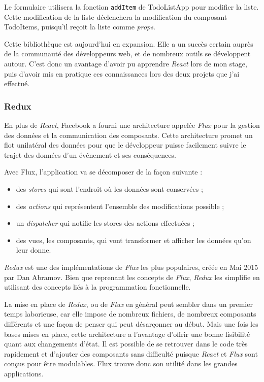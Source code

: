 Le formulaire utilisera la fonction \texttt{addItem} de TodoListApp pour
modifier la liste. Cette modification de la liste déclenchera la
modification du composant TodoItems, puisqu'il reçoit la liste comme
\emph{props}.

\bigskip

Cette bibliothèque est aujourd'hui en expansion. Elle a un succès
certain auprès de la communauté des développeurs web, et de nombreux
outils se développent autour. C'est donc un avantage d'avoir pu
apprendre \emph{React} lors de mon stage, puis d'avoir mis en pratique
ces connaissances lors des deux projets que j'ai effectué.

\bigskip

\subsubsection{Redux}\label{redux}

\bigskip

En plus de \emph{React}, Facebook a fourni une architecture appelée
\emph{Flux} pour la gestion des données et la communication des
composants. Cette architecture promet un flot unilatéral des données
pour que le développeur puisse facilement suivre le trajet des données
d'un événement et ses conséquences.

\bigskip

Avec Flux, l'application va se décomposer de la façon suivante :

\begin{itemize}
\tightlist
\item
  des \emph{stores} qui sont l'endroit où les données sont conservées ;
\item
  des \emph{actions} qui représentent l'ensemble des modifications
  possible ;
\item
  un \emph{dispatcher} qui notifie les stores des actions effectuées ;
\item
  des vues, les composants, qui vont transformer et afficher les données
  qu'on leur donne.
\end{itemize}

\bigskip

\emph{Redux} est une des implémentations de \emph{Flux} les plus
populaires, créée en Mai 2015 par Dan Abramov. Bien que reprenant les
concepts de \emph{Flux}, \emph{Redux} les simplifie en utilisant des
concepts liés à la programmation fonctionnelle.

\bigskip

La mise en place de \emph{Redux}, ou de \emph{Flux} en général peut
sembler dans un premier temps laborieuse, car elle impose de nombreux
fichiers, de nombreux composants différents et une façon de penser qui
peut désarçonner au début. Mais une fois les bases mises en place, cette
architecture a l'avantage d'offrir une bonne lisibilité quant aux
changements d'état. Il est possible de se retrouver dans le code très
rapidement et d'ajouter des composants sans difficulté puisque
\emph{React} et \emph{Flux} sont conçus pour être modulables. Flux
trouve donc son utilité dans les grandes applications.

